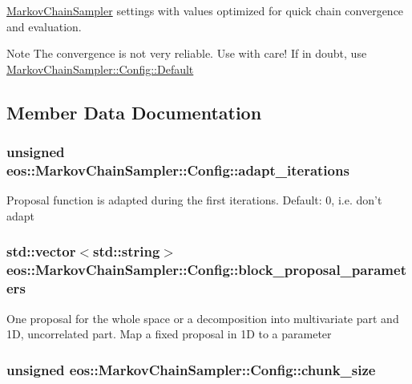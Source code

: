 \hyperlink{classeos_1_1MarkovChainSampler}{MarkovChainSampler} settings with values optimized for quick chain convergence and evaluation.

\begin{DoxyNote}{Note}
The convergence is not very reliable. Use with care! If in doubt, use \hyperlink{classeos_1_1MarkovChainSampler_1_1Config_a873df585d161c55e45b69fe45def8bd0}{MarkovChainSampler::Config::Default} 
\end{DoxyNote}


\subsection{Member Data Documentation}
\hypertarget{classeos_1_1MarkovChainSampler_1_1Config_ad90feb40e232329acf8a1fb785ed2d87}{
\subsubsection[{adapt\_\-iterations}]{\setlength{\rightskip}{0pt plus 5cm}unsigned {\bf eos::MarkovChainSampler::Config::adapt\_\-iterations}}}
\label{classeos_1_1MarkovChainSampler_1_1Config_ad90feb40e232329acf8a1fb785ed2d87}
Proposal function is adapted during the first iterations. Default: 0, i.e. don't adapt \hypertarget{classeos_1_1MarkovChainSampler_1_1Config_af6ef8839a138b5f2ba25ed00c9949ecf}{
\subsubsection[{block\_\-proposal\_\-parameters}]{\setlength{\rightskip}{0pt plus 5cm}std::vector$<$std::string$>$ {\bf eos::MarkovChainSampler::Config::block\_\-proposal\_\-parameters}}}
\label{classeos_1_1MarkovChainSampler_1_1Config_af6ef8839a138b5f2ba25ed00c9949ecf}
One proposal for the whole space or a decomposition into multivariate part and 1D, uncorrelated part. Map a fixed proposal in 1D to a parameter \hypertarget{classeos_1_1MarkovChainSampler_1_1Config_a3286979755ea75bd563fb66fba9e5330}{
\subsubsection[{chunk\_\-size}]{\setlength{\rightskip}{0pt plus 5cm}unsigned {\bf eos::MarkovChainSampler::Config::chunk\_\-size}}}
\label{classeos_1_1MarkovChainSampler_1_1Config_a3286979755ea75bd563fb66fba9e5330}


